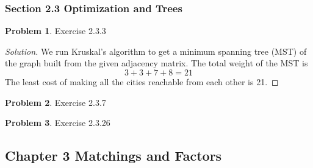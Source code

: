 \documentclass[12pt]{article}
\theoremstyle{definition}
\newtheorem{problem}{Problem}
\newenvironment*{solution}{\begin{proof}[Solution]}{\end{proof}}
\begin{document}
\subsubsection*{Section 2.3 Optimization and Trees}
\begin{problem}
    Exercise 2.3.3
\end{problem}
\begin{solution}
    We run Kruskal's algorithm to get a minimum spanning tree (MST) of the
    graph built from the given adjacency matrix. The total weight of the MST
    is \[3+3+7+8=21\] The least cost of making all the cities reachable from
    each other is 21.
\end{solution}
\begin{problem}
    Exercise 2.3.7
\end{problem}
\begin{problem}
    Exercise 2.3.26
\end{problem}

\subsection*{Chapter 3 Matchings and Factors}
\end{document}
